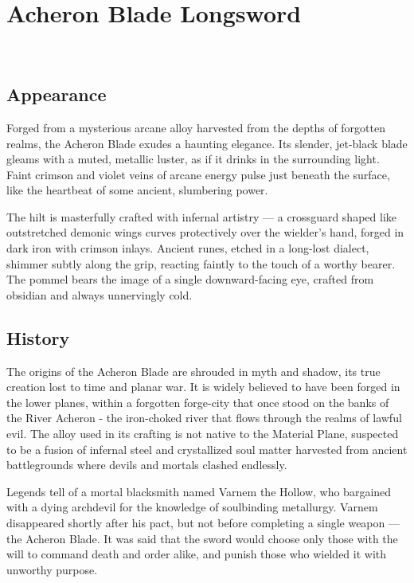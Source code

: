 
\chapter*{Acheron Blade Longsword}
\\

\section*{Appearance}
Forged from a mysterious arcane alloy harvested from the depths of forgotten realms, the Acheron Blade exudes a haunting elegance. Its slender, jet-black blade gleams with a muted, metallic luster, as if it drinks in the surrounding light. Faint crimson and violet veins of arcane energy pulse just beneath the surface, like the heartbeat of some ancient, slumbering power.

The hilt is masterfully crafted with infernal artistry — a crossguard shaped like outstretched demonic wings curves protectively over the wielder's hand, forged in dark iron with crimson inlays. Ancient runes, etched in a long-lost dialect, shimmer subtly along the grip, reacting faintly to the touch of a worthy bearer. The pommel bears the image of a single downward-facing eye, crafted from obsidian and always unnervingly cold.

\section*{History}
The origins of the Acheron Blade are shrouded in myth and shadow, its true creation lost to time and planar war. It is widely believed to have been forged in the lower planes, within a forgotten forge-city that once stood on the banks of the River Acheron - the iron-choked river that flows through the realms of lawful evil. The alloy used in its crafting is not native to the Material Plane, suspected to be a fusion of infernal steel and crystallized soul matter harvested from ancient battlegrounds where devils and mortals clashed endlessly.

Legends tell of a mortal blacksmith named Varnem the Hollow, who bargained with a dying archdevil for the knowledge of soulbinding metallurgy. Varnem disappeared shortly after his pact, but not before completing a single weapon — the Acheron Blade. It was said that the sword would choose only those with the will to command death and order alike, and punish those who wielded it with unworthy purpose.

